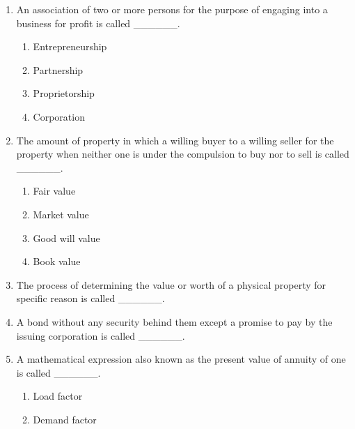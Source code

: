 \documentclass[11pt,a4paper]{article}
\begin{document}
\begin{enumerate}
\item{An association of two or more persons for the purpose of engaging into a business for profit is called \_\_\_\_\_\_.}
\begin{enumerate}[label=\Alph*.]
\item{Entrepreneurship}
\item{Partnership}
\item{Proprietorship}
\item{Corporation}
\end{enumerate}
\item{The amount of property in which a willing buyer to a willing seller for the property when neither one is under the compulsion to buy nor to sell is called \_\_\_\_\_\_.}
\begin{enumerate}[label=\Alph*.]
\item{Fair value}
\item{Market value}
\item{Good will value}
\item{Book value}
\end{enumerate}
\item{The process of determining the value or worth of a physical property for specific reason is called \_\_\_\_\_\_.}
\\
\item{A bond without any security behind them except a promise to pay by the issuing corporation is called \_\_\_\_\_\_.}
\\
\item{A mathematical expression also known as the present value of annuity of one is called \_\_\_\_\_\_.}
\begin{enumerate}[label=\Alph*.]
\item{Load factor}
\item{Demand factor}

\end{enumerate}
\end{enumerate}
\end{document}

